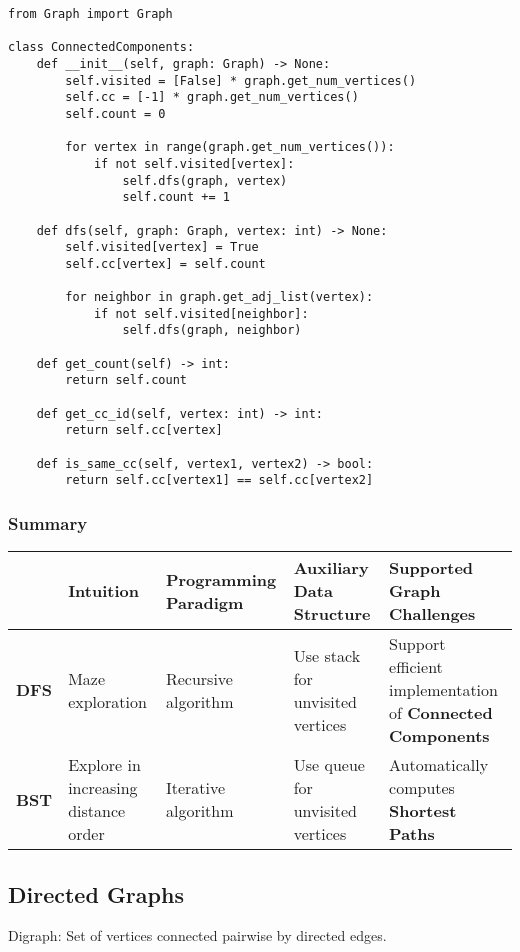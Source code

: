 \documentclass[a4paper]{article}
\begin{document}
\begin{lstlisting}
from Graph import Graph

class ConnectedComponents:
    def __init__(self, graph: Graph) -> None:
        self.visited = [False] * graph.get_num_vertices()
        self.cc = [-1] * graph.get_num_vertices()
        self.count = 0

        for vertex in range(graph.get_num_vertices()):
            if not self.visited[vertex]:
                self.dfs(graph, vertex)
                self.count += 1

    def dfs(self, graph: Graph, vertex: int) -> None:
        self.visited[vertex] = True
        self.cc[vertex] = self.count

        for neighbor in graph.get_adj_list(vertex):
            if not self.visited[neighbor]:
                self.dfs(graph, neighbor)

    def get_count(self) -> int:
        return self.count

    def get_cc_id(self, vertex: int) -> int:
        return self.cc[vertex]

    def is_same_cc(self, vertex1, vertex2) -> bool:
        return self.cc[vertex1] == self.cc[vertex2]
\end{lstlisting}

\subsubsection*{Summary}
\begin{spacing}{1.5}
\begin{tabularx}{1\textwidth}{|p{}|X|X|X|X|}
    \hline
    & \textbf{Intuition} & \textbf{Programming Paradigm} & \textbf{Auxiliary Data Structure} & \textbf{Supported Graph Challenges}\\
    \hline
    \textbf{DFS}&Maze exploration&Recursive algorithm&Use stack for unvisited vertices&Support efficient implementation of \textbf{Connected Components}\\
    \hline
    \textbf{BST}&Explore in increasing distance order&Iterative algorithm&Use queue for unvisited vertices&Automatically computes \textbf{Shortest Paths}\\
    \hline
\end{tabularx}
\end{spacing}

\subsection{Directed Graphs}
Digraph: Set of vertices connected pairwise by directed edges.
\end{document}
